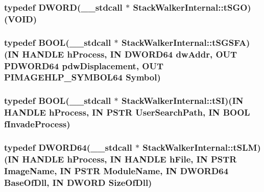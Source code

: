 \hypertarget{class_stack_walker_internal_aaec62abb6d868f9020216020f050d9de}{
\subsubsection[{t\-S\-G\-O}]{\setlength{\rightskip}{0pt plus 5cm}typedef {\bf D\-W\-O\-R\-D}(\-\_\-\-\_\-stdcall $\ast$ Stack\-Walker\-Internal\-::t\-S\-G\-O)(V\-O\-I\-D)}}\label{class_stack_walker_internal_aaec62abb6d868f9020216020f050d9de}
\hypertarget{class_stack_walker_internal_a95863814be54b0a535e4ec8570ab1a10}{
\subsubsection[{t\-S\-G\-S\-F\-A}]{\setlength{\rightskip}{0pt plus 5cm}typedef {\bf B\-O\-O\-L}(\-\_\-\-\_\-stdcall $\ast$ Stack\-Walker\-Internal\-::t\-S\-G\-S\-F\-A)(I\-N H\-A\-N\-D\-L\-E h\-Process, I\-N {\bf D\-W\-O\-R\-D64} dw\-Addr, O\-U\-T {\bf P\-D\-W\-O\-R\-D64} pdw\-Displacement, O\-U\-T {\bf P\-I\-M\-A\-G\-E\-H\-L\-P\-\_\-\-S\-Y\-M\-B\-O\-L64} Symbol)}}\label{class_stack_walker_internal_a95863814be54b0a535e4ec8570ab1a10}
\hypertarget{class_stack_walker_internal_adc383ff1fa52e09c460c0ba4b8ba9a3b}{
\subsubsection[{t\-S\-I}]{\setlength{\rightskip}{0pt plus 5cm}typedef {\bf B\-O\-O\-L}(\-\_\-\-\_\-stdcall $\ast$ Stack\-Walker\-Internal\-::t\-S\-I)(I\-N H\-A\-N\-D\-L\-E h\-Process, I\-N P\-S\-T\-R User\-Search\-Path, I\-N {\bf B\-O\-O\-L} f\-Invade\-Process)}}\label{class_stack_walker_internal_adc383ff1fa52e09c460c0ba4b8ba9a3b}
\hypertarget{class_stack_walker_internal_a151d0d6060e9fbca922bbcf86502b466}{
\subsubsection[{t\-S\-L\-M}]{\setlength{\rightskip}{0pt plus 5cm}typedef {\bf D\-W\-O\-R\-D64}(\-\_\-\-\_\-stdcall $\ast$ Stack\-Walker\-Internal\-::t\-S\-L\-M)(I\-N H\-A\-N\-D\-L\-E h\-Process, I\-N H\-A\-N\-D\-L\-E h\-File, I\-N P\-S\-T\-R Image\-Name, I\-N P\-S\-T\-R Module\-Name, I\-N {\bf D\-W\-O\-R\-D64} Base\-Of\-Dll, I\-N {\bf D\-W\-O\-R\-D} Size\-Of\-Dll)}}\label{class_stack_walker_internal_a151d0d6060e9fbca922bbcf86502b466}
